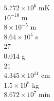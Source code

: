 \documentclass[12pt,addpoints,answers]{evalua}
\begin{document}
\begin{questions}
\begin{minipage}[t][][t]{.78\textwidth}
      \end{minipage}
      \begin{minipage}[t][][t]{.3\textwidth}
            \begin{choices}
                  \choice $5.772  \times 10^6$ mK   \\
                  \choice $10^{-10}$ m              \\
                  \choice $8 \times 10^{-5}$ m      \\
                  \choice $8.64 \times 10^4$ s      \\
                  \choice $27$                      \\
                  \choice $0.014$ g                 \\
                  \choice $21$                      \\
                  \choice $4.345 \times 10^{14}$ cm \\
                  \choice $1.5 \times 10^5$ kg      \\
                  \choice $8.672 \times 10^7$ min   \\
            \end{choices}
      \end{minipage}



\end{questions}
\end{document}
